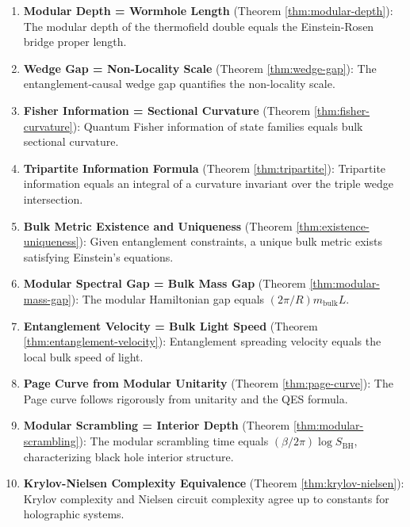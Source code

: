 \documentclass[12pt,a4paper]{article}
\begin{document}
\begin{enumerate}
    \item \textbf{Modular Depth = Wormhole Length} (Theorem \ref{thm:modular-depth}): The modular depth of the thermofield double equals the Einstein-Rosen bridge proper length.
    
    \item \textbf{Wedge Gap = Non-Locality Scale} (Theorem \ref{thm:wedge-gap}): The entanglement-causal wedge gap quantifies the non-locality scale.
    
    \item \textbf{Fisher Information = Sectional Curvature} (Theorem \ref{thm:fisher-curvature}): Quantum Fisher information of state families equals bulk sectional curvature.
    
    \item \textbf{Tripartite Information Formula} (Theorem \ref{thm:tripartite}): Tripartite information equals an integral of a curvature invariant over the triple wedge intersection.
    
    \item \textbf{Bulk Metric Existence and Uniqueness} (Theorem \ref{thm:existence-uniqueness}): Given entanglement constraints, a unique bulk metric exists satisfying Einstein's equations.
    
    \item \textbf{Modular Spectral Gap = Bulk Mass Gap} (Theorem \ref{thm:modular-mass-gap}): The modular Hamiltonian gap equals $(2\pi/R) m_{\text{bulk}} L$.
    
    \item \textbf{Entanglement Velocity = Bulk Light Speed} (Theorem \ref{thm:entanglement-velocity}): Entanglement spreading velocity equals the local bulk speed of light.
    
    \item \textbf{Page Curve from Modular Unitarity} (Theorem \ref{thm:page-curve}): The Page curve follows rigorously from unitarity and the QES formula.
    
    \item \textbf{Modular Scrambling = Interior Depth} (Theorem \ref{thm:modular-scrambling}): The modular scrambling time equals $(\beta/2\pi)\log S_{\text{BH}}$, characterizing black hole interior structure.
    
    \item \textbf{Krylov-Nielsen Complexity Equivalence} (Theorem \ref{thm:krylov-nielsen}): Krylov complexity and Nielsen circuit complexity agree up to constants for holographic systems.
    

\end{enumerate}
\end{document}
